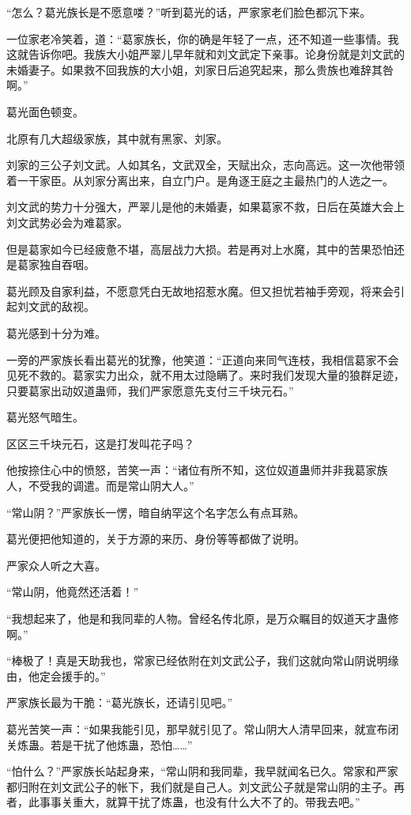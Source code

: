 \begin{this_body}
“怎么？葛光族长是不愿意喽？”听到葛光的话，严家家老们脸色都沉下来。

一位家老冷笑着，道：“葛家族长，你的确是年轻了一点，还不知道一些事情。我这就告诉你吧。我族大小姐严翠儿早年就和刘文武定下亲事。论身份就是刘文武的未婚妻子。如果救不回我族的大小姐，刘家日后追究起来，那么贵族也难辞其咎啊。”

葛光面色顿变。

北原有几大超级家族，其中就有黑家、刘家。

刘家的三公子刘文武。人如其名，文武双全，天赋出众，志向高远。这一次他带领着一干家臣。从刘家分离出来，自立门户。是角逐王庭之主最热门的人选之一。

刘文武的势力十分强大，严翠儿是他的未婚妻，如果葛家不救，日后在英雄大会上刘文武势必会为难葛家。

但是葛家如今已经疲惫不堪，高层战力大损。若是再对上水魔，其中的苦果恐怕还是葛家独自吞咽。

葛光顾及自家利益，不愿意凭白无故地招惹水魔。但又担忧若袖手旁观，将来会引起刘文武的敌视。

葛光感到十分为难。

一旁的严家族长看出葛光的犹豫，他笑道：“正道向来同气连枝，我相信葛家不会见死不救的。葛家实力出众，就不用太过隐瞒了。来时我们发现大量的狼群足迹，只要葛家出动奴道蛊师，我们严家愿意先支付三千块元石。”

葛光怒气暗生。

区区三千块元石，这是打发叫花子吗？

他按捺住心中的愤怒，苦笑一声：“诸位有所不知，这位奴道蛊师并非我葛家族人，不受我的调遣。而是常山阴大人。”

“常山阴？”严家族长一愣，暗自纳罕这个名字怎么有点耳熟。

葛光便把他知道的，关于方源的来历、身份等等都做了说明。

严家众人听之大喜。

“常山阴，他竟然还活着！”

“我想起来了，他是和我同辈的人物。曾经名传北原，是万众瞩目的奴道天才蛊修啊。”

“棒极了！真是天助我也，常家已经依附在刘文武公子，我们这就向常山阴说明缘由，他定会援手的。”

严家族长最为干脆：“葛光族长，还请引见吧。”

葛光苦笑一声：“如果我能引见，那早就引见了。常山阴大人清早回来，就宣布闭关炼蛊。若是干扰了他炼蛊，恐怕……”

“怕什么？”严家族长站起身来，“常山阴和我同辈，我早就闻名已久。常家和严家都归附在刘文武公子的帐下，我们就是自己人。刘文武公子就是常山阴的主子。再者，此事事关重大，就算干扰了炼蛊，也没有什么大不了的。带我去吧。”


\end{this_body}
